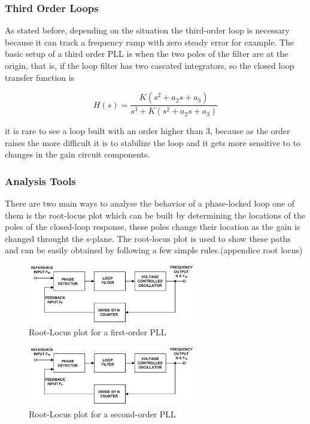 \subsubsection{Third Order Loops}

As stated before, depending on the situation the third-order loop is necessary
because it can track a frequency ramp with zero steady error for example. The
basic setup of a third order PLL is when the two poles of the filter are at the
origin, that is, if the loop filter has two cascated integrators, so the closed
loop transfer function is

\begin{equation}
    H(s)=\frac{K(s^2+a_2s+a_3)}{s^3+K(s^2+a_2s+a_3)}
    \label{eq:tf3rd}
\end{equation}

it is rare to see a loop built with an order higher than 3, because as the order
raises the more difficult it is to stabilize the loop and it gets more sensitive
to to changes in the gain circuit components.

\subsubsection{Analysis Tools}
There are two main ways to analyse the behavior of a phase-locked loop one of
them is the root-locus plot which can be built by determining the locations of
the poles of the closed-loop response, these poles change their location as the
gain is changed throught the s-plane. The root-locus plot is used to show these
paths and can be easily obtained by following a few simple rules.(appendice root
locus)

\begin{figure}[htbp]
    \centering
    \includegraphics[width=0.65\textwidth]{./figures/pll.eps}
    \caption{ Root-Locus plot for a first-order PLL
    \label{fig:rlocus1}}
\end{figure}

\begin{figure}[htbp]
    \centering
    \includegraphics[width=0.65\textwidth]{./figures/pll.eps}
    \caption{ Root-Locus plot for a second-order PLL
    \label{fig:rlocus2}}
\end{figure}

